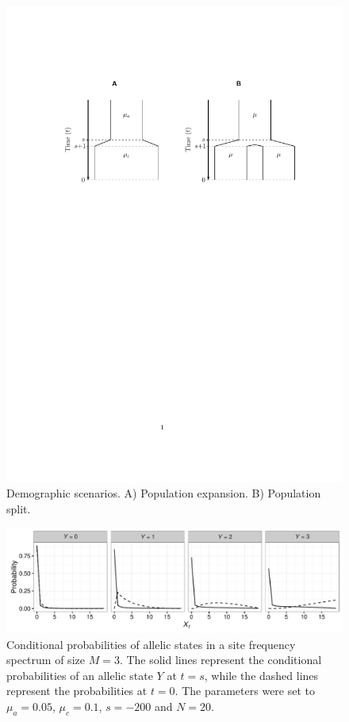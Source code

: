 \documentclass[preprint]{elsarticle}
\newcommand\y{\ensuremath{Y}}
\begin{document}
{\begin{figure}[ht]
\includegraphics[width = 12cm]{diags.pdf}
\caption{Demographic scenarios. A) Population expansion. B) Population split.}\label{diag}
\end{figure}

\begin{figure}[ht]
\includegraphics[width = 12cm]{cProb.pdf}
\caption{Conditional probabilities of allelic states in a site frequency spectrum of size $M=3$. The solid lines represent the conditional probabilities of an allelic state $\y$ at $t=s$, while the dashed lines represent the probabilities at $t=0$. The parameters were set to $\mu_a=0.05$, $\mu_c=0.1$, $s=-200$ and $N=20$.}\label{cProb}
\end{figure}

}
\end{document}
